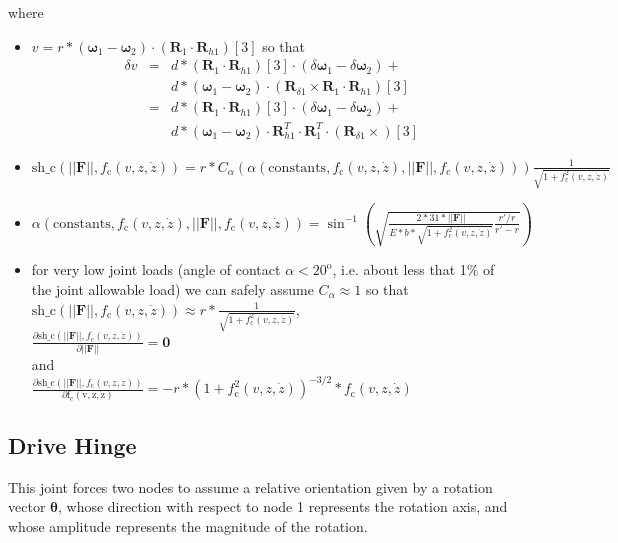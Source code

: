 \documentclass[10pt,dvips]{report}
\newcommand{\T}[1]{\boldsymbol{#1}}
\begin{document}
where
\begin{itemize}
\item
$v=r * (\T \omega_{1}-\T \omega_{2})\cdot(\T R_1\cdot \T R_{h1})[3]$
so that
\begin{eqnarray*}
\delta v &=& d * (\T R_1\cdot \T R_{h1})[3] \cdot (\delta \T \omega_{1}- \delta \T \omega_{2}) +\\
	&& d * (\T \omega_{1}-\T \omega_{2})\cdot (\T R_{\delta 1} \times \T R_1 \cdot \T R_{h1})[3]\\
	&=& d * (\T R_1\cdot \T R_{h1})[3] \cdot (\delta \T \omega_{1}- \delta \T \omega_{2}) +\\
	&& d * (\T \omega_{1}-\T \omega_{2})\cdot \T R_{h1}^T \cdot \T R_1^T \cdot (\T R_{\delta 1} \times )[3]
\end{eqnarray*}
\item
$
\mathrm{sh\_c}(||\T F||, f_{\mathrm{c}}(v,z,\dot{z}))=
r * 
C_\alpha(
	\alpha(\mathrm{constants},
		f_{\mathrm{c}}(v,z,\dot{z}),
		||\T F||,
		f_{\mathrm{c}}(v,z,\dot{z})
	)
) 
\frac{\displaystyle 1}{\displaystyle \sqrt{1+f_{\mathrm{c}}^2(v,z,\dot{z})}}
$
\item
$
\alpha(\mathrm{constants},
	f_{\mathrm{c}}(v,z,\dot{z}),
	||\T F||,
	f_{\mathrm{c}}(v,z,\dot{z})
) =
\sin^{-1}\left(
	\sqrt{
		\frac{\displaystyle 2*31*||\T F||}
			{\displaystyle E*b*\sqrt{1+f_{\mathrm{c}}^2(v,z,\dot{z})}}
		\frac{\displaystyle r'/r}
			{\displaystyle r'-r}
	}
\right)
$
\item for very low joint loads (angle of contact $\alpha< 20^{\mathrm{o}}$,
i.e. about less that 1\% of the joint allowable load)
we can safely assume $C_\alpha\approx 1$
so that\\ 
$
\mathrm{sh\_c}(||\T F||, f_{\mathrm{c}}(v,z,\dot{z}))\approx
r * 
\frac{\displaystyle 1}{\displaystyle \sqrt{1+f_{\mathrm{c}}^2(v,z,\dot{z})}}
$,\\

$
\frac{\displaystyle\partial \mathrm{sh\_c}(||\T F||, f_{\mathrm{c}}(v,z,\dot{z}))}
	{\displaystyle \partial ||\T F||} = \T 0
$\\
and\\
$
\frac{\displaystyle\partial \mathrm{sh\_c}(||\T F||, f_{\mathrm{c}}(v,z,\dot{z}))}
	{\displaystyle\partial \mathrm{f_{\mathrm{c}}(v,z,\dot{z})}} =
	-r * (1+f_{\mathrm{c}}^2(v,z,\dot{z}))^{-3/2}*f_{\mathrm{c}}(v,z,\dot{z})
$
\end{itemize}




\subsection{Drive Hinge}
This joint forces two nodes to assume a relative orientation
given by a rotation vector $\T{\theta}$, whose direction with respect
to node 1 represents the rotation axis, and whose amplitude represents 
the magnitude of the rotation.
\end{document}
